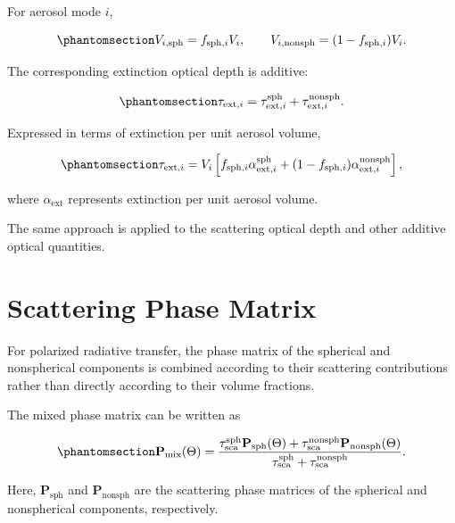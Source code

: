 \documentclass[
  11pt,
  letterpaper,
]{scrreprt}
\begin{document}
For aerosol mode \(i\),

\begin{equation}\phantomsection\label{eq-shape-mode-volume}{
V_{i,\mathrm{sph}}
=
f_{\mathrm{sph},i}V_i,
\qquad
V_{i,\mathrm{nonsph}}
=
(1-f_{\mathrm{sph},i})V_i.
}\end{equation}

The corresponding extinction optical depth is additive:

\begin{equation}\phantomsection\label{eq-shape-extinction}{
\tau_{\mathrm{ext},i}
=
\tau_{\mathrm{ext},i}^{\mathrm{sph}}
+
\tau_{\mathrm{ext},i}^{\mathrm{nonsph}}.
}\end{equation}

Expressed in terms of extinction per unit aerosol volume,

\begin{equation}\phantomsection\label{eq-shape-extinction-volume}{
\tau_{\mathrm{ext},i}
=
V_i
\left[
f_{\mathrm{sph},i}\alpha_{\mathrm{ext},i}^{\mathrm{sph}}
+
(1-f_{\mathrm{sph},i})
\alpha_{\mathrm{ext},i}^{\mathrm{nonsph}}
\right],
}\end{equation}

where \(\alpha_{\mathrm{ext}}\) represents extinction per unit aerosol
volume.

The same approach is applied to the scattering optical depth and other
additive optical quantities.

\section{Scattering Phase Matrix}\label{scattering-phase-matrix}

For polarized radiative transfer, the phase matrix of the spherical and
nonspherical components is combined according to their scattering
contributions rather than directly according to their volume fractions.

The mixed phase matrix can be written as

\begin{equation}\phantomsection\label{eq-shape-phase-matrix}{
\mathbf{P}_{\mathrm{mix}}(\Theta)
=
\frac{
\tau_{\mathrm{sca}}^{\mathrm{sph}}
\mathbf{P}_{\mathrm{sph}}(\Theta)
+
\tau_{\mathrm{sca}}^{\mathrm{nonsph}}
\mathbf{P}_{\mathrm{nonsph}}(\Theta)
}{
\tau_{\mathrm{sca}}^{\mathrm{sph}}
+
\tau_{\mathrm{sca}}^{\mathrm{nonsph}}
}.
}\end{equation}

Here, \(\mathbf{P}_{\mathrm{sph}}\) and \(\mathbf{P}_{\mathrm{nonsph}}\)
are the scattering phase matrices of the spherical and nonspherical
components, respectively.
\end{document}
